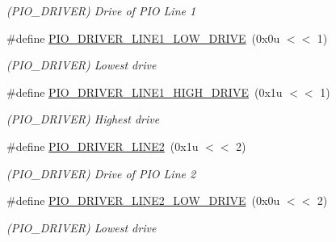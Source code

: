 \begin{DoxyCompactItemize}
\begin{DoxyCompactList}\small\item\em (P\+I\+O\+\_\+\+D\+R\+I\+V\+ER) Drive of P\+IO Line 1 \end{DoxyCompactList}\item 
\mbox{\label{group__SAMV71__PIO_ga5d5d26e9e59145502a1f2ae79d423825}} 
\#define \mbox{\hyperlink{group__SAMV71__PIO_ga5d5d26e9e59145502a1f2ae79d423825}{P\+I\+O\+\_\+\+D\+R\+I\+V\+E\+R\+\_\+\+L\+I\+N\+E1\+\_\+\+L\+O\+W\+\_\+\+D\+R\+I\+VE}}~(0x0u $<$$<$ 1)
\begin{DoxyCompactList}\small\item\em (P\+I\+O\+\_\+\+D\+R\+I\+V\+ER) Lowest drive \end{DoxyCompactList}\item 
\mbox{\label{group__SAMV71__PIO_ga8ff344092884c5989a56833a084a816c}} 
\#define \mbox{\hyperlink{group__SAMV71__PIO_ga8ff344092884c5989a56833a084a816c}{P\+I\+O\+\_\+\+D\+R\+I\+V\+E\+R\+\_\+\+L\+I\+N\+E1\+\_\+\+H\+I\+G\+H\+\_\+\+D\+R\+I\+VE}}~(0x1u $<$$<$ 1)
\begin{DoxyCompactList}\small\item\em (P\+I\+O\+\_\+\+D\+R\+I\+V\+ER) Highest drive \end{DoxyCompactList}\item 
\mbox{\label{group__SAMV71__PIO_ga4ad0cee6d1444b97947e347f4e7a0440}} 
\#define \mbox{\hyperlink{group__SAMV71__PIO_ga4ad0cee6d1444b97947e347f4e7a0440}{P\+I\+O\+\_\+\+D\+R\+I\+V\+E\+R\+\_\+\+L\+I\+N\+E2}}~(0x1u $<$$<$ 2)
\begin{DoxyCompactList}\small\item\em (P\+I\+O\+\_\+\+D\+R\+I\+V\+ER) Drive of P\+IO Line 2 \end{DoxyCompactList}\item 
\mbox{\label{group__SAMV71__PIO_gaa7f2e228d10daac59b18cf7dbde4386a}} 
\#define \mbox{\hyperlink{group__SAMV71__PIO_gaa7f2e228d10daac59b18cf7dbde4386a}{P\+I\+O\+\_\+\+D\+R\+I\+V\+E\+R\+\_\+\+L\+I\+N\+E2\+\_\+\+L\+O\+W\+\_\+\+D\+R\+I\+VE}}~(0x0u $<$$<$ 2)
\begin{DoxyCompactList}\small\item\em (P\+I\+O\+\_\+\+D\+R\+I\+V\+ER) Lowest drive \end{DoxyCompactList}\item 

\end{DoxyCompactItemize}
